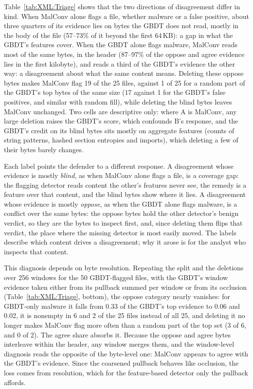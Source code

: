 Table~\ref{tab:XML:Triage} shows that the two directions of disagreement differ in kind. When MalConv alone flags a
file, whether malware or a false positive, about three quarters of its evidence lies on bytes the GBDT does not read,
mostly in the body of the file (57--73\% of it beyond the first 64\,KB): a gap in what the GBDT's features cover. When
the GBDT alone flags malware, MalConv reads most of the same bytes, in the header (87--97\% of the oppose and agree
evidence lies in the first kilobyte), and reads a third of the GBDT's evidence the other way: a disagreement about what
the same content means. Deleting these oppose bytes makes MalConv flag 19 of the 25 files, against 1 of 25 for a random
part of the GBDT's top bytes of the same size (17 against 1 for the GBDT's false positives, and similar with random
fill), while deleting the blind bytes leaves MalConv unchanged. Two cells are descriptive only: where A is MalConv, any
large deletion raises the GBDT's score, which confounds B's response, and the GBDT's credit on its blind bytes sits
mostly on aggregate features (counts of string patterns, hashed section entropies and imports), which deleting a few of
their bytes barely changes.

Each label points the defender to a different response. A disagreement whose evidence is mostly \emph{blind}, as when
MalConv alone flags a file, is a coverage gap: the flagging detector reads content the other's features never see, the
remedy is a feature over that content, and the blind bytes show where it lies. A disagreement whose evidence is mostly
\emph{oppose}, as when the GBDT alone flags malware, is a conflict over the same bytes: the oppose bytes hold the other
detector's benign verdict, so they are the bytes to inspect first, and, since deleting them flips that verdict, the
place where the missing detector is most easily moved. The labels describe which content drives a disagreement; why it
arose is for the analyst who inspects that content.

This diagnosis depends on byte resolution. Repeating the split and the deletions over 256 windows for the 50
GBDT-flagged files, with the GBDT's window evidence taken either from its pullback summed per window or from its
occlusion (Table~\ref{tab:XML:Triage}, bottom), the oppose category nearly vanishes: for GBDT-only malware it falls from
0.33 of the GBDT's top evidence to 0.06 and 0.02, it is nonempty in 6 and 2 of the 25 files instead of all 25, and
deleting it no longer makes MalConv flag more often than a random part of the top set (3 of 6, and 0 of 2). The agree
share absorbs it. Because the oppose and agree bytes interleave within the header, any window merges them, and the
window-level diagnosis reads the opposite of the byte-level one: MalConv appears to agree with the GBDT's evidence.
Since the coarsened pullback behaves like occlusion, the loss comes from resolution, which for the feature-based
detector only the pullback affords.

